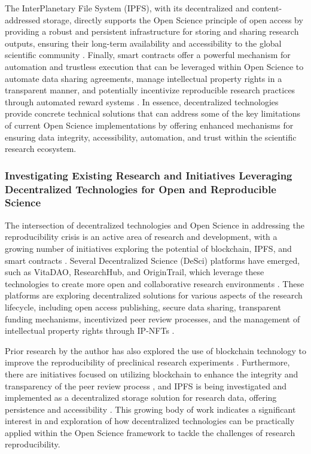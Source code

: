 \documentclass{article}
\begin{document}
The InterPlanetary File System (IPFS), with its decentralized and content-addressed storage, directly supports the Open Science principle of open access by providing a robust and persistent infrastructure for storing and sharing research outputs, ensuring their long-term availability and accessibility to the global scientific community \cite{benet2014ipfs}. Finally, smart contracts offer a powerful mechanism for automation and trustless execution that can be leveraged within Open Science to automate data sharing agreements, manage intellectual property rights in a transparent manner, and potentially incentivize reproducible research practices through automated reward systems \cite{szabo1997formalizing}. In essence, decentralized technologies provide concrete technical solutions that can address some of the key limitations of current Open Science implementations by offering enhanced mechanisms for ensuring data integrity, accessibility, automation, and trust within the scientific research ecosystem.

\subsubsection{Investigating Existing Research and Initiatives Leveraging Decentralized Technologies for Open and Reproducible Science}

The intersection of decentralized technologies and Open Science in addressing the reproducibility crisis is an active area of research and development, with a growing number of initiatives exploring the potential of blockchain, IPFS, and smart contracts \cite{benet2014ipfs}. Several Decentralized Science (DeSci) platforms have emerged, such as VitaDAO, ResearchHub, and OriginTrail, which leverage these technologies to create more open and collaborative research environments \cite{benet2014ipfs}. These platforms are exploring decentralized solutions for various aspects of the research lifecycle, including open access publishing, secure data sharing, transparent funding mechanisms, incentivized peer review processes, and the management of intellectual property rights through IP-NFTs \cite{benet2014ipfs}.

Prior research by the author has also explored the use of blockchain technology to improve the reproducibility of preclinical research experiments \cite{author2023blockchain}. Furthermore, there are initiatives focused on utilizing blockchain to enhance the integrity and transparency of the peer review process \cite{bartling2014opening}, and IPFS is being investigated and implemented as a decentralized storage solution for research data, offering persistence and accessibility \cite{dabek2001wide}. This growing body of work indicates a significant interest in and exploration of how decentralized technologies can be practically applied within the Open Science framework to tackle the challenges of research reproducibility.
\end{document}
